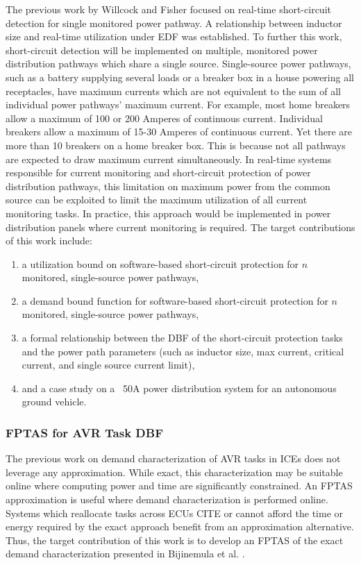 The previous work by Willcock and Fisher \cite{willcock_trading_2017} focused on real-time short-circuit detection for single monitored power pathway.
A relationship between inductor size and real-time utilization under EDF was established.
To further this work, short-circuit detection will be implemented on multiple, monitored power distribution pathways which share a single source.
Single-source power pathways, such as a battery supplying several loads or a breaker box in a house powering all receptacles, have maximum currents which are not equivalent to the sum of all individual power pathways' maximum current.
For example, most home breakers allow a maximum of 100 or 200 Amperes of continuous current.
Individual breakers allow a maximum of 15-30 Amperes of continuous current.
Yet there are more than 10 breakers on a home breaker box.
This is because not all pathways are expected to draw maximum current simultaneously.
In real-time systems responsible for current monitoring and short-circuit protection of power distribution pathways, this limitation on maximum power from the common source can be exploited to limit the maximum utilization of all current monitoring tasks.
In practice, this approach would be implemented in power distribution panels where current monitoring is required.
The target contributions of this work include:
\begin{enumerate}
    \item a utilization bound on software-based short-circuit protection for $n$ monitored, single-source power pathways,
    \item a demand bound function for software-based short-circuit protection for $n$ monitored, single-source power pathways,
    \item a formal relationship between the DBF of the short-circuit protection tasks and the power path parameters (such as inductor size, max current, critical current, and single source current limit),
    \item and a case study on a ~50A power distribution system for an autonomous ground vehicle.
\end{enumerate}

\subsubsection{FPTAS for AVR Task DBF}

The previous  work on demand characterization of AVR tasks in ICEs does not leverage any approximation.
While exact, this characterization may be suitable online where computing power and time are significantly constrained.
An FPTAS approximation is useful where demand characterization is performed online.
Systems which reallocate tasks across ECUs CITE or cannot afford the time or energy required by the exact approach benefit from an approximation alternative.
Thus, the target contribution of this work is to develop an FPTAS of the exact demand characterization presented in Bijinemula et al. \cite{bijinemula_efficient_2019}.

